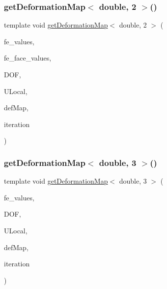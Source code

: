 \mbox{\label{function_evaluations_8cc_ad204a932cf153014c52e1c59196fab28}} 
\subsubsection{\texorpdfstring{get\+Deformation\+Map$<$ double, 2 $>$()}{getDeformationMap< double, 2 >()}\hspace{0.1cm}{\footnotesize\ttfamily [2/2]}}
{\footnotesize\ttfamily template void \mbox{\hyperlink{group___evaluation_functions_ga239b206235603af9482484c29c8d57ea}{get\+Deformation\+Map}}$<$ double, 2 $>$ (\begin{DoxyParamCaption}\item[{const F\+E\+Values$<$ 2 $>$ \&}]{fe\+\_\+values,  }\item[{const F\+E\+Face\+Values$<$ 2 $>$ \&}]{fe\+\_\+face\+\_\+values,  }\item[{unsigned int}]{D\+OF,  }\item[{Table$<$ 1, double $>$ \&}]{U\+Local,  }\item[{\mbox{\hyperlink{structdeformation_map}{deformation\+Map}}$<$ double, 2 $>$ \&}]{def\+Map,  }\item[{unsigned int}]{iteration }\end{DoxyParamCaption})}

\mbox{\label{function_evaluations_8cc_a9d25cc478ac60031a64a48a1687fabc2}} 
\subsubsection{\texorpdfstring{get\+Deformation\+Map$<$ double, 3 $>$()}{getDeformationMap< double, 3 >()}\hspace{0.1cm}{\footnotesize\ttfamily [1/2]}}
{\footnotesize\ttfamily template void \mbox{\hyperlink{group___evaluation_functions_ga239b206235603af9482484c29c8d57ea}{get\+Deformation\+Map}}$<$ double, 3 $>$ (\begin{DoxyParamCaption}\item[{const F\+E\+Values$<$ 3 $>$ \&}]{fe\+\_\+values,  }\item[{unsigned int}]{D\+OF,  }\item[{Table$<$ 1, double $>$ \&}]{U\+Local,  }\item[{\mbox{\hyperlink{structdeformation_map}{deformation\+Map}}$<$ double, 3 $>$ \&}]{def\+Map,  }\item[{unsigned int}]{iteration }\end{DoxyParamCaption})}


